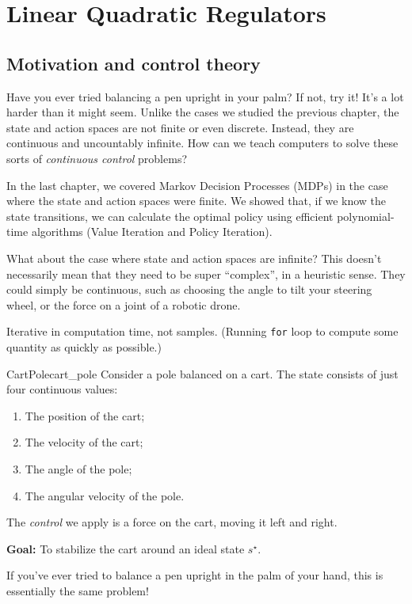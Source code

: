 \documentclass[../main/main]{subfiles}
\begin{document}
    
\chapter{Linear Quadratic Regulators}


\section{Motivation and control theory}

Have you ever tried balancing a pen upright in your palm?
If not, try it! It's a lot harder than it might seem.
Unlike the cases we studied the previous chapter,
the state and action spaces are not finite or even discrete.
Instead, they are continuous and uncountably infinite.
How can we teach computers to solve these sorts of \emph{continuous control} problems?

In the last chapter, we covered Markov Decision Processes (MDPs) in the case
where the state and action spaces were finite.
We showed that, if we know the state transitions,
we can calculate the optimal policy using efficient polynomial-time algorithms
(Value Iteration and Policy Iteration).


What about the case where state and action spaces are infinite?
This doesn't necessarily mean that they need to be super ``complex'', in a heuristic sense.
They could simply be continuous, such as choosing the angle to tilt your
steering wheel, or the force on a joint of a robotic drone.


Iterative in computation time, not samples.
(Running \texttt{for} loop to compute some quantity as quickly as possible.)


\begin{example}{CartPole}{cart_pole}
    Consider a pole balanced on a cart.
    The state consists of just four continuous values:
    \begin{enumerate}
        \item The position of the cart;
        \item The velocity of the cart;
        \item The angle of the pole;
        \item The angular velocity of the pole.
    \end{enumerate}
    The \emph{control} we apply is a force on the cart, moving it left and right.

    \textbf{Goal:} To stabilize the cart around an ideal state $s^\star$.

    If you've ever tried to balance a pen upright in the palm of your hand, this is essentially the same problem!
\end{example}
\end{document}
